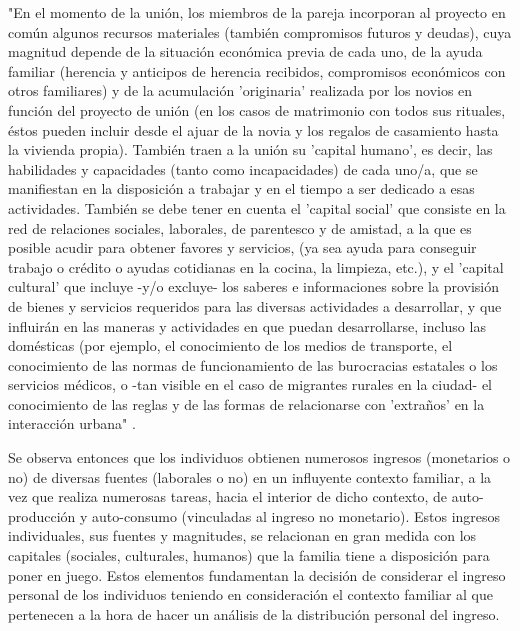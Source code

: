 "En el momento de la unión, los miembros de la pareja incorporan al proyecto en común algunos recursos materiales (también compromisos futuros y deudas), cuya magnitud depende de la situación económica previa de cada uno, de la ayuda familiar (herencia y anticipos de herencia recibidos, compromisos económicos con otros familiares) y de la acumulación 'originaria' realizada por los novios en función del proyecto de unión (en los casos de matrimonio con todos sus rituales, éstos pueden incluir desde el ajuar de la novia y los regalos de casamiento hasta la vivienda propia). También traen a la unión su 'capital humano', es decir, las habilidades y capacidades (tanto como incapacidades) de cada uno/a, que se manifiestan en la disposición a trabajar y en el tiempo a ser dedicado a esas actividades. También se debe tener en cuenta el 'capital social' que consiste en la red de relaciones sociales, laborales, de parentesco y de amistad, a la que es posible acudir para obtener favores y servicios, (ya sea ayuda para conseguir trabajo o crédito o ayudas cotidianas en la cocina, la limpieza, etc.), y el 'capital cultural' que incluye -y/o excluye- los saberes e informaciones sobre la provisión de bienes y servicios requeridos para las diversas actividades a desarrollar, y que influirán en las maneras y actividades en que puedan desarrollarse, incluso las domésticas (por ejemplo, el conocimiento de los medios de transporte, el conocimiento de las normas de funcionamiento de las burocracias estatales o los servicios médicos, o -tan visible en el caso de migrantes rurales en la ciudad- el conocimiento de las reglas y de las formas de relacionarse con 'extraños' en la interacción urbana" \cite[p.~96]{jelin}.
	
Se observa entonces que los individuos obtienen numerosos ingresos (monetarios o no) de diversas fuentes (laborales o no) en un influyente contexto familiar, a la vez que realiza numerosas tareas, hacia el interior de dicho contexto, de auto-producción y auto-consumo (vinculadas al ingreso no monetario). Estos ingresos individuales, sus fuentes y magnitudes, se relacionan en gran medida con los capitales (sociales, culturales, humanos) que la familia tiene a disposición para poner en juego. Estos elementos fundamentan la decisión de considerar el ingreso personal de los individuos teniendo en consideración el contexto familiar al que pertenecen a la hora de hacer un análisis de la distribución personal del ingreso.
		
